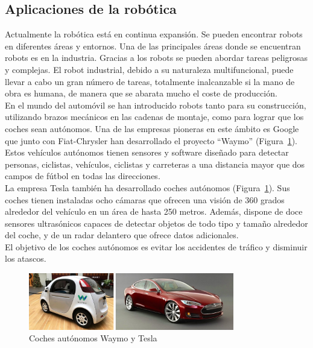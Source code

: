 \subsection{Aplicaciones de la robótica}
Actualmente la robótica está en continua expansión. Se pueden encontrar robots en diferentes áreas y entornos. Una de las principales áreas donde se encuentran robots es en la industria. Gracias a los robots se pueden abordar tareas peligrosas y complejas. El robot industrial, debido a su naturaleza multifuncional, puede llevar a cabo un gran número de tareas, totalmente inalcanzable si la mano de obra es humana, de manera que se abarata mucho el coste de producción. \\

En el mundo del automóvil se han introducido robots tanto para su construcción, utilizando brazos mecánicos en las cadenas de montaje, como para lograr que los coches sean autónomos. Una de las empresas pioneras en este ámbito es Google que junto con Fiat-Chrysler han desarrollado el proyecto ``Waymo'' (Figura~\ref{fig.coches}). Estos vehículos autónomos tienen sensores y software diseñado para detectar personas, ciclistas, vehículos, ciclistas y carreteras a una distancia mayor que dos campos de fútbol en todas las direcciones. \\

La empresa Tesla también ha desarrollado coches autónomos (Figura~\ref{fig.coches}). Sus coches tienen instaladas ocho cámaras que ofrecen una visión de 360 grados alrededor del vehículo en un área de hasta 250 metros. Además, dispone de doce sensores ultrasónicos capaces de detectar objetos de todo tipo y tamaño alrededor del coche, y de un radar delantero que ofrece datos adicionales.\\

El objetivo de los coches autónomos es evitar los accidentes de tráfico y disminuir los atascos. \\

\begin{figure}[H]
  \begin{center}
    \includegraphics[width=0.8\textwidth]{figures/Introduccion/coches.jpg}
		\caption{Coches autónomos Waymo y Tesla}
		\label{fig.coches}
		\end{center}
\end{figure}

